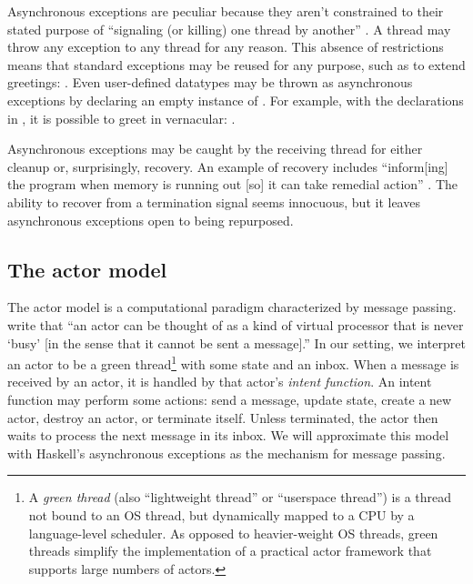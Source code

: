 \documentclass[sigplan,screen]{acmart}
\begin{document}
Asynchronous exceptions are peculiar because they aren't constrained to their
stated purpose of ``signaling (or killing) one
thread by another'' \cite{marlow2001async}.
%
A thread may throw any exception to any thread for any reason.
%
This absence of restrictions means that standard exceptions may be reused for
any purpose, such as to extend greetings:
.
%
Even
user-defined datatypes may be thrown as asynchronous exceptions by
declaring an empty instance of  \cite{marlow2006extensible}.
%
For example, with the declarations in , it is possible to greet
in vernacular: .

Asynchronous exceptions may be caught by the receiving thread for
either cleanup or, surprisingly, recovery.
%
An example of recovery includes ``inform[ing] the program when memory is
running out [so] it can take remedial action'' \cite{marlow2001async}.
%
The ability to recover from a termination signal seems innocuous, but
it leaves asynchronous exceptions open to being repurposed.

\subsection{The actor model}
\label{sec:actor-model}

The actor model is a computational paradigm characterized by message passing.
%
\citet{hewitt1973actors} write that ``an actor can be thought of as a kind of
virtual processor that is never `busy' [in the sense that it cannot be sent a
message].''
%
In our setting, we interpret an actor to be a green thread\footnote{
    A \emph{green thread} (also ``lightweight thread'' or ``userspace thread'')
    is a thread not bound to an OS thread, but dynamically mapped to a CPU by a
    language-level scheduler.
    As opposed to heavier-weight OS threads, green threads simplify the implementation of a practical actor framework that supports large numbers of actors.
} with some state and an inbox.
%
When a message is received by an actor,
it is handled by that actor's \emph{intent function}.
%
An intent function may perform some actions:
send a message, update state, create a new actor, destroy an actor, or
terminate itself.
%
Unless terminated, the actor then waits to process the next message in its
inbox.
%
We will approximate this model with Haskell's asynchronous exceptions as the
mechanism for message passing.
\end{document}
